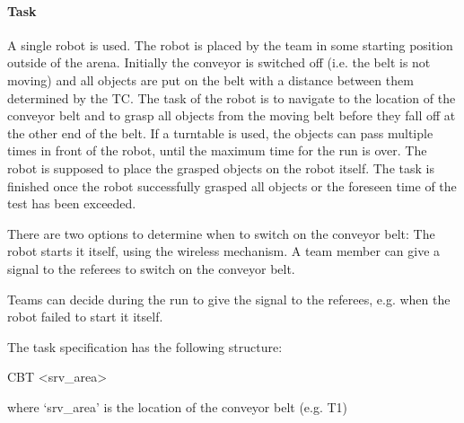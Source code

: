\paragraph{Task}
A single robot is used. The robot is placed by the team in some starting position outside of the arena. Initially the conveyor is switched off (i.e. the belt is not moving) and all objects are put on the belt with a distance between them determined by the TC. The task of the robot is to navigate to the location of the conveyor belt and to grasp all objects from the moving belt before they fall off at the other end of the belt. If a turntable is used, the objects can pass multiple times in front of the robot, until the maximum time for the run is over. The robot is supposed to place the grasped objects on the robot itself. The task is finished once the robot successfully grasped all objects or the foreseen time of the test has been exceeded. 
\par
There are two options to determine when to switch on the conveyor belt:
The robot starts it itself, using the wireless mechanism.
A team member can give a signal to the referees to switch on the conveyor belt.
\par
Teams can decide during the run to give the signal to the referees, e.g. when the robot failed to start it itself. 
\par
The task specification has the following structure:
\par
CBT \textless srv\_area\textgreater
\par
where ‘srv\_area’ is the location of the conveyor belt (e.g. T1)



%



